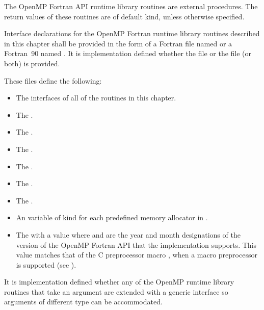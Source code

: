 \begin{fortranspecific}
The OpenMP Fortran API runtime library routines are external procedures. The return
values of these routines are of default kind, unless otherwise specified.

Interface declarations for the OpenMP Fortran runtime library routines described in this
chapter shall be provided in the form of a Fortran  file named  or
a Fortran~90  named . It is implementation defined whether the
 file or the  file (or both) is provided.

These files define the following:

\begin{itemize}
\item The interfaces of all of the routines in this chapter.

\item The   .

\item The   .

\item The   .

\item The   .

\item The   .

\item The   .

\item An   variable of kind  for each predefined memory allocator in .

\item The    with a value  where 
and  are the year and month designations of the version of the OpenMP Fortran
API that the implementation supports. This value matches that of the C preprocessor
macro , when a macro preprocessor is supported (see
).
\end{itemize}


It is implementation defined whether any of the OpenMP runtime library routines that
take an argument are extended with a generic interface so arguments of different 
type can be accommodated. 
\end{fortranspecific}







